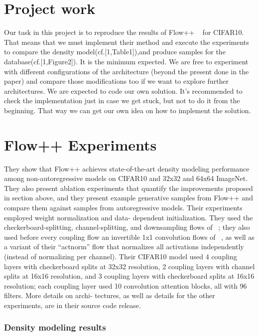 \documentclass[]{IEEEtran}
\begin{document}
\section{Project work}
Our task in this project is to reproduce the results of Flow++ ~\cite{pmlr-v97-ho19a} for CIFAR10. That means that we must implement their method and execute the experiments to compare the density model(cf.[1,Table1]),and produce samples for the database(cf.[1,Figure2]). It is the minimum expected. We are free to experiment with different conﬁgurations of the architecture (beyond the present done in the paper) and compare those modiﬁcations too if we want to explore further architectures. We are expected to code our own solution. It's recommended to check the implementation just in case we get stuck, but not to do it from the beginning. That way we can get our own idea on how to implement the solution. 

\section{Flow++ Experiments}
They show that Flow++ achieves state-of-the-art density modeling performance among non-autoregressive models on CIFAR10 and 32x32 and 64x64 ImageNet. They also present ablation experiments that quantify the improvements proposed in section above, and they present example generative samples from Flow++ and compare them against samples from autoregressive models. 
Their experiments employed weight normalization and data- dependent initialization. They used the checkerboard-splitting, channel-splitting, and downsampling flows of ~\cite{DBLP:journals/corr/DinhSB16}; they also used before every coupling flow an invertible 1x1 convolution flows of ~\cite{NIPS2018_8224}, as well as a variant of their “actnorm” flow that normalizes all activations independently 
(instead of normalizing per channel). Their CIFAR10 model used 4 coupling layers with checkerboard splits at 32x32 resolution, 2 coupling layers with channel splits at 16x16 resolution, and 3 coupling layers with checkerboard splits at 16x16 resolution; each coupling layer used 10 convolution attention blocks, all with 96 filters. More details on archi- tectures, as well as details for the other experiments, are in their source code release. 

\subsubsection{Density modeling results }
\end{document}
